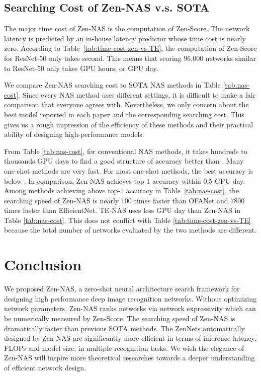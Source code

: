\documentclass{article}
\begin{document}
\subsection{Searching Cost of Zen-NAS  v.s. SOTA}
\label{sec:Searching-Cost-of-Zen-NAS}



The major time cost of Zen-NAS is the computation of Zen-Score. The network latency is predicted by an in-house latency predictor whose time cost is nearly zero. According to  Table~\ref{tab:time-cost-zen-vs-TE}, the computation of Zen-Score for ResNet-50 only takes  second. This means that scoring 96,000 networks similar to ResNet-50 only takes  GPU hours, or  GPU day.

We compare Zen-NAS searching cost to SOTA NAS methods in Table \ref{tab:nas-cost}. Since every NAS method uses different settings, it is difficult to make a fair comparison that everyone agrees with. Nevertheless, we only concern about the best model reported in each paper and the corresponding searching cost. This gives us a rough impression of the efficiency of these methods and their practical ability of designing high-performance models.

From Table \ref{tab:nas-cost}, for conventional NAS methods, it takes hundreds to thousands GPU days to find a good structure of accuracy better than . Many one-shot methods are very fast. For most one-shot methods, the best accuracy is below  . In comparison, Zen-NAS achieves  top-1 accuracy within 0.5 GPU day. Among methods achieving above  top-1 accuracy in Table~\ref{tab:nas-cost}, the searching speed of Zen-NAS is nearly 100 times faster than OFANet and 7800 times faster than EfficientNet. 
TE-NAS uses less GPU day than Zen-NAS in Table \ref{tab:nas-cost}. This does not conflict with Table \ref{tab:time-cost-zen-vs-TE} because the total number of networks evaluated by the two methods are different.

\section{Conclusion}

We proposed Zen-NAS, a zero-shot neural architecture search framework for designing high performance deep image recognition networks. Without optimizing network parameters, Zen-NAS ranks networks via network expressivity which can be numerically measured by Zen-Score. The searching speed of Zen-NAS is dramatically faster than previous SOTA methods. The ZenNets automatically designed by Zen-NAS are significantly more efficient in terms of inference latency, FLOPs and model size, in multiple recognition tasks. We wish the elegance of Zen-NAS will inspire more theoretical researches towards a deeper understanding of efficient network design.
\end{document}
